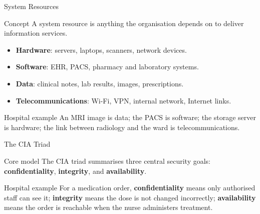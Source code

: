 \documentclass[presentation]{beamer}
\begin{document}
\begin{frame}[c]{System Resources}
\begin{block}{Concept}
A system resource is anything the organisation depends on to deliver information services.
\end{block}

\begin{itemize}
    \item \textbf{Hardware}: servers, laptops, scanners, network devices.
    \item \textbf{Software}: EHR, PACS, pharmacy and laboratory systems.
    \item \textbf{Data}: clinical notes, lab results, images, prescriptions.
    \item \textbf{Telecommunications}: Wi-Fi, VPN, internal network, Internet links.
\end{itemize}

\begin{exampleblock}{Hospital example}
An MRI image is data; the PACS is software; the storage server is hardware; the link between
radiology and the ward is telecommunications.
\end{exampleblock}
\end{frame}

\begin{frame}[c]{The CIA Triad}
\begin{block}{Core model}
The CIA triad summarises three central security goals:
\textbf{confidentiality}, \textbf{integrity}, and \textbf{availability}.
\end{block}

\begin{exampleblock}{Hospital example}
For a medication order, \textbf{confidentiality} means only authorised staff can see it;
\textbf{integrity} means the dose is not changed incorrectly; \textbf{availability} means the order is
reachable when the nurse administers treatment.
\end{exampleblock}
\end{frame}
\end{document}
